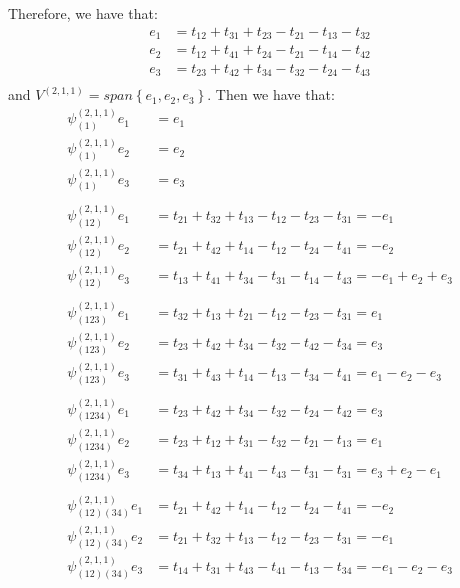 \documentclass[]{article}
\begin{document}
Therefore, we have that:
\begin{align*}
	e_1 &= t_{12} + t_{31} + t_{23} - t_{21} - t_{13} - t_{32}\\
	e_2 &= t_{12} + t_{41} + t_{24} - t_{21} - t_{14} - t_{42} \\
	e_3 &= t_{23} + t_{42} + t_{34} - t_{32} - t_{24} - t_{43}\\
\end{align*}
and $V^{(2,1,1)} = span \left\{e_1, e_2, e_3\right\}$. 
Then we have that:
\begin{align*}
	\psi^{(2,1,1)}_{(1)} e_1 &= e_1\\
	\psi^{(2,1,1)}_{(1)} e_2 &= e_2\\
	\psi^{(2,1,1)}_{(1)} e_3 &= e_3\\
	\\
	\psi^{(2,1,1)}_{(12)} e_1 &=  t_{21} + t_{32} + t_{13} - t_{12} - t_{23} - t_{31} = - e_1\\
	\psi^{(2,1,1)}_{(12)} e_2 &=  t_{21} + t_{42} + t_{14} - t_{12} - t_{24} - t_{41} = - e_2\\
	\psi^{(2,1,1)}_{(12)} e_3 &=  t_{13} + t_{41} + t_{34} - t_{31} - t_{14} - t_{43} = -e_1 + e_2 + e_3\\
	\\
	\psi^{(2,1,1)}_{(123)} e_1 &= t_{32} + t_{13} + t_{21} - t_{12} - t_{23} - t_{31} = e_1\\
	\psi^{(2,1,1)}_{(123)} e_2 &= t_{23} + t_{42} + t_{34} - t_{32} - t_{42} - t_{34} = e_3\\
	\psi^{(2,1,1)}_{(123)} e_3 &= t_{31} + t_{43} + t_{14} - t_{13} - t_{34} - t_{41} = e_1 - e_2 - e_3\\
	\\
	\psi^{(2,1,1)}_{(1234)} e_1 &= t_{23} + t_{42} + t_{34} - t_{32} - t_{24} - t_{42} = e_3\\
	\psi^{(2,1,1)}_{(1234)} e_2 &= t_{23} + t_{12} + t_{31} - t_{32} - t_{21} - t_{13} = e_1\\
	\psi^{(2,1,1)}_{(1234)} e_3 &= t_{34} + t_{13} + t_{41} - t_{43} - t_{31} - t_{31} = e_3 + e_2 - e_1\\
	\\
	\psi^{(2,1,1)}_{(12)(34)} e_1 &= t_{21} + t_{42} + t_{14} - t_{12} - t_{24} - t_{41} = - e_2\\
	\psi^{(2,1,1)}_{(12)(34)} e_2 &= t_{21} + t_{32} + t_{13} - t_{12} - t_{23} - t_{31} = - e_1\\
	\psi^{(2,1,1)}_{(12)(34)} e_3 &= t_{14} + t_{31} + t_{43} - t_{41} - t_{13} - t_{34} = -e_1 - e_2 - e_3\\
\end{align*} 
\end{document}
